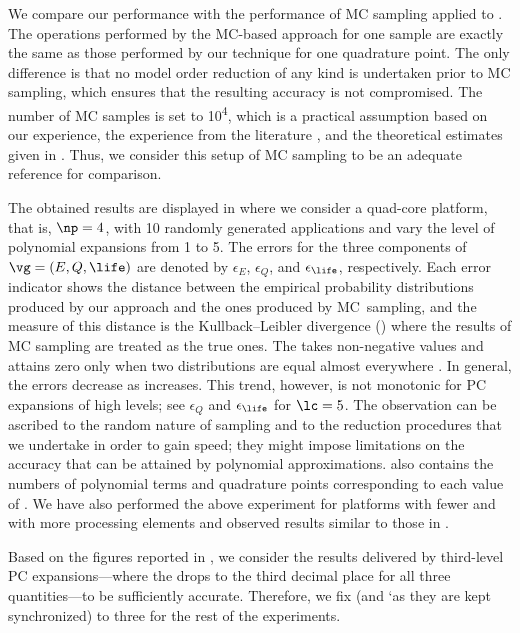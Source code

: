 We compare our performance with the performance of \ac{MC} sampling applied to
. The operations performed by the
\ac{MC}-based approach for one sample are exactly the same as those performed by
our technique for one quadrature point. The only difference is that no model
order reduction of any kind is undertaken prior to \ac{MC} sampling, which
ensures that the resulting accuracy is not compromised. The number of \ac{MC}
samples is set to 10\textsuperscript{4}, which is a practical assumption based
on our experience, the experience from the literature \cite{xiang2010, juan2012,
lee2013}, and the theoretical estimates given in \cite{diaz-emparanza2002}.
Thus, we consider this setup of \ac{MC} sampling to be an adequate reference for
comparison.

The obtained results are displayed in  where
we consider a quad-core platform, that is, $\np = 4$, with 10 randomly generated
applications and vary the level of polynomial expansions \lc from 1 to 5. The
errors for the three components of $\vg = (E, Q, \life)$ are denoted by
$\epsilon_E$, $\epsilon_Q$, and $\epsilon_{\life}$, respectively. Each error
indicator shows the distance between the empirical probability distributions
produced by our approach and the ones produced by \ac{MC}\ sampling, and the
measure of this distance is the Kullback--Leibler divergence ()
\cite{gelman2013, hastie2013} where the results of \ac{MC} sampling are treated
as the true ones. The  takes non-negative values and attains zero only
when two distributions are equal almost everywhere \cite{durrett2010}. In
general, the errors decrease as \lc increases. This trend, however, is not
monotonic for \ac{PC} expansions of high levels; see $\epsilon_Q$ and
$\epsilon_{\life}$ for $\lc = 5$. The observation can be ascribed to the random
nature of sampling and to the reduction procedures that we undertake in order to
gain speed; they might impose limitations on the accuracy that can be attained
by polynomial approximations.  also contains
the numbers of polynomial terms \nc and quadrature points \nq corresponding to
each value of \lc. We have also performed the above experiment for platforms
with fewer and with more processing elements and observed results similar to
those in .

Based on the figures reported in , we consider
the results delivered by third-level \ac{PC} expansions---where the 
drops to the third decimal place for all three quantities---to be sufficiently
accurate. Therefore, we fix \lc (and \lq as they are kept synchronized) to three
for the rest of the experiments.

